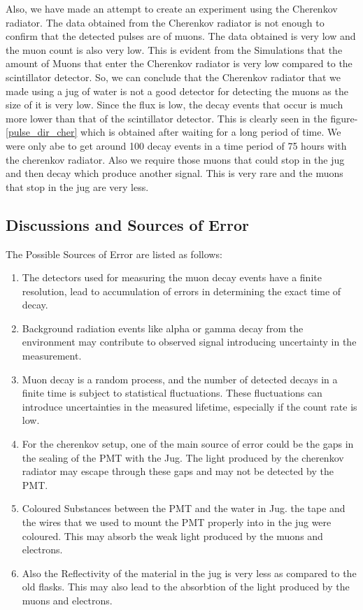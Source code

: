 \documentclass{article}
\begin{document}
\begin{multicols}{2}
Also, we have made an attempt to create an experiment using the Cherenkov radiator. The data obtained from the Cherenkov radiator is not enough to confirm that the detected pulses are of muons. The data obtained is very low and the muon count is also very low. This is evident from the Simulations that the amount of Muons that enter the Cherenkov radiator is very low compared to the scintillator detector. So, we can conclude that the Cherenkov radiator that we made using a jug of water is not a good detector for detecting the muons as the size of it is very low. Since the flux is low, the decay events that occur is much more lower than that of the scintillator detector. This is clearly seen in the figure-\ref{pulse_dir_cher} which is obtained after waiting for a long period of time. We were only abe to get around 100 decay events in a time period of 75 hours with the cherenkov radiator. Also we require those muons that could stop in the jug and then decay which produce another signal. This is very rare and the muons that stop in the jug are very less.

\subsection{Discussions and Sources of Error}

The Possible Sources of Error are listed as follows:

\begin{enumerate}
    \item The detectors used for measuring the muon decay events have a finite resolution, lead to accumulation of errors in determining the exact time of decay.
    \item Background radiation events like alpha or gamma decay from the environment may contribute to observed signal introducing uncertainty in the measurement.
    \item Muon decay is a random process, and the number of detected decays in a finite time is subject to statistical fluctuations. These fluctuations can introduce uncertainties in the measured lifetime, especially if the count rate is low.
    \item For the cherenkov setup, one of the main source of error could be the gaps in the sealing of the PMT with the Jug. The light produced by the cherenkov radiator may escape through these gaps and may not be detected by the PMT.
    \item Coloured Substances between the PMT and the water in Jug. the tape and the wires that we used to mount the PMT properly into in the jug were coloured. This may absorb the weak light produced by the muons and electrons.
    \item Also the Reflectivity of the material in the jug is very less as compared to the old flasks. This may also lead to the absorbtion of the light produced by the muons and electrons.
\end{enumerate}



\end{multicols}
\end{document}
